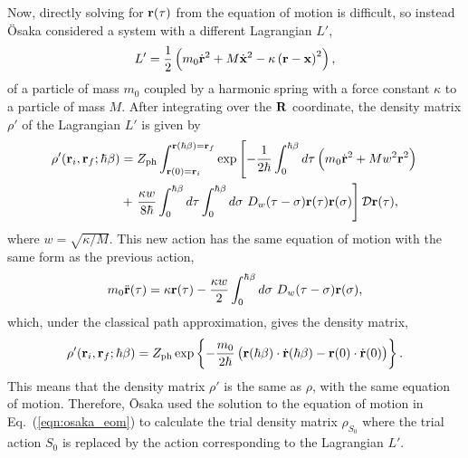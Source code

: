 Now, directly solving for $\vb{r}(\tau)$ from the equation of motion is difficult, so instead \"Osaka considered a system with a different Lagrangian $L'$,
\begin{equation}
    L' = \frac{1}{2} \left( m_0\dot{\vb{r}}^2 + M\dot{\vb{x}}^2 - \kappa \left( \vb{r} - \vb{x} \right)^2 \right),
\label{eqn-223-12}
\end{equation}
of a particle of mass $m_0$ coupled by a harmonic spring with a force constant $\kappa$ to a particle of mass $M$. After integrating over the $\vb{R}$ coordinate, the density matrix $\rho'$ of the Lagrangian $L'$ is given by
\begin{equation}
    \begin{aligned}
        \rho'(\vb{r}_i, \vb{r}_f; \hbar\beta) &= Z_{\text{ph}} \int_{\vb{r}(0) = \vb{r}_i}^{\vb{r}(\hbar\beta) = \vb{r}_f} \exp \left[-\frac{1}{2\hbar} \int_0^{\hbar\beta} d\tau \left(m_0 \dot{\vb{r}}^2 + M w^2 \vb{r}^2\right)\right. \\
        &+ \left.\frac{\kappa w}{8\hbar} \int^{\hbar\beta}_0 d\tau \int^{\hbar\beta}_0 d\sigma\ D_{w}(\tau - \sigma) \vb{r}(\tau) \vb{r}(\sigma) \right] \mathcal{D}\vb{r}(\tau),
    \end{aligned}
\label{eqn-223-13}
\end{equation}
where $w = \sqrt{\kappa / M}$. This new action has the same equation of motion with the same form as the previous action,
\begin{equation}
    m_0 \ddot{\vb{r}}(\tau) = \kappa \vb{r}(\tau) - \frac{\kappa w}{2} \int^{\hbar\beta}_0 d\sigma\ D_{w}(\tau - \sigma) \vb{r}(\sigma),
\label{eqn-223-14:osaka_eom}
\end{equation}
which, under the classical path approximation, gives the density matrix,
\begin{equation}
    \rho'(\vb{r}_i, \vb{r}_f; \hbar\beta) = Z_{\text{ph}} \exp \left\{-\frac{m_0}{2\hbar}\left( \vb{r}(\hbar\beta) \cdot \dot{\vb{r}}(\hbar\beta) - \vb{r}(0) \cdot \dot{\vb{r}}(0) \right)\right\}.
\label{eqn-223-15}
\end{equation}
This means that the density matrix $\rho'$ is the same as $\rho$, with the same equation of motion. Therefore, \=Osaka used the solution to the equation of motion in Eq.~(\ref{eqn:osaka_eom}) to calculate the trial density matrix $\rho_{S_0}$ where the trial action $S_0$ is replaced by the action corresponding to the Lagrangian $L'$. 

